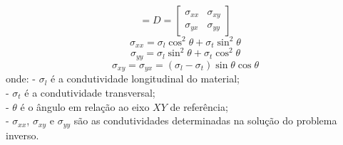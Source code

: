\documentclass[
12pt,
a4paper,
oneside,
chapter=TITLE,
sumario=tradicional
]{abntex2}
\begin{document}
\begin{equation*} %
	[\mathbf{\sigma}] = D =
	\begin{bmatrix}  
		\sigma_{xx} & \sigma_{xy} \\  
		\sigma_{yx} &\sigma_{yy} 
	\end{bmatrix} 	
\end{equation*}
\begin{equation*}
	\sigma_{xx}
	=
	\sigma_l \cos^2\theta + \sigma_t \sin^2\theta  
\end{equation*}
\begin{equation*}
	\sigma_{yy}
	=
	\sigma_l \sin^2\theta + \sigma_t \cos^2\theta  
\end{equation*}
\begin{equation*}
	\sigma_{xy} = \sigma_{yx}
	=
	(\sigma_l-\sigma_t)\sin\theta\cos\theta 
\end{equation*}
onde:
- $\sigma_l$ é a condutividade longitudinal do material;\\
- $\sigma_t$ é a condutividade transversal;\\
- $\theta$ é o ângulo em relação ao eixo $XY$ de referência;\\
- $\sigma_{xx}$, $\sigma_{xy}$ e $\sigma_{yy}$ são as condutividades determinadas na solução do problema inverso.\\
\end{document}
